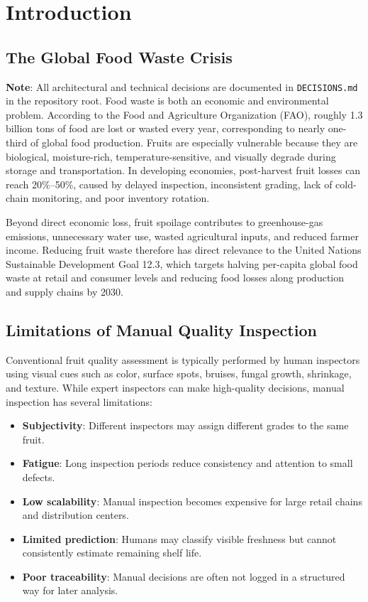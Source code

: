 \documentclass[conference]{IEEEtran}
\begin{document}
\section{Introduction}
\subsection{The Global Food Waste Crisis}
\textbf{Note}: All architectural and technical decisions are documented in \texttt{DECISIONS.md} in the repository root.
Food waste is both an economic and environmental problem. According to the Food and Agriculture Organization (FAO), roughly 1.3 billion tons of food are lost or wasted every year, corresponding to nearly one-third of global food production. Fruits are especially vulnerable because they are biological, moisture-rich, temperature-sensitive, and visually degrade during storage and transportation. In developing economies, post-harvest fruit losses can reach 20\%--50\%, caused by delayed inspection, inconsistent grading, lack of cold-chain monitoring, and poor inventory rotation.

Beyond direct economic loss, fruit spoilage contributes to greenhouse-gas emissions, unnecessary water use, wasted agricultural inputs, and reduced farmer income. Reducing fruit waste therefore has direct relevance to the United Nations Sustainable Development Goal 12.3, which targets halving per-capita global food waste at retail and consumer levels and reducing food losses along production and supply chains by 2030.

\subsection{Limitations of Manual Quality Inspection}
Conventional fruit quality assessment is typically performed by human inspectors using visual cues such as color, surface spots, bruises, fungal growth, shrinkage, and texture. While expert inspectors can make high-quality decisions, manual inspection has several limitations:
\begin{itemize}
    \item \textbf{Subjectivity}: Different inspectors may assign different grades to the same fruit.
    \item \textbf{Fatigue}: Long inspection periods reduce consistency and attention to small defects.
    \item \textbf{Low scalability}: Manual inspection becomes expensive for large retail chains and distribution centers.
    \item \textbf{Limited prediction}: Humans may classify visible freshness but cannot consistently estimate remaining shelf life.
    \item \textbf{Poor traceability}: Manual decisions are often not logged in a structured way for later analysis.
\end{itemize}
\end{document}
